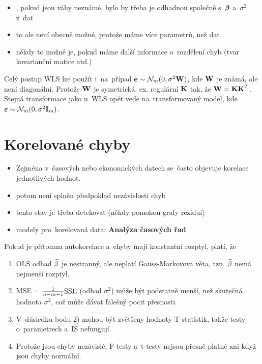 \begin{remark}
\begin{itemize}
	\item, pokud jsou váhy neznámé, bylo by třeba je odhadnou společně s~$\boldsymbol{\beta}$ a~$\sigma^2$ z~dat
	\item to ale není obecně možné, protože máme více parametrů, než dat
	\item někdy to možné je, pokud máme další informace o~rozdělení chyb (tvar kovarianční matice atd.)
\end{itemize}
\end{remark}

\begin{remark}
	Celý postup WLS lze použít i~na~případ $\mathbf{e} \sim \mathcal{N}_m(0,\sigma^2 \textbf{W})$, kde $\textbf{W}$ je známá, ale není diagonální. Protože $\textbf{W}$ je symetrická, ex. regulární $\textbf{K}$ tak, že $\textbf{W} = \textbf{K} \textbf{K}^T$. Stejná transformace jako u~WLS opět vede na~transformovaný model, kde $\boldsymbol{\varepsilon} \sim \mathcal{N}_m(0,\sigma^2 \textbf{I}_{m})$.
\end{remark}

\section{Korelované chyby}
\begin{itemize}
\item Zejména v~časových nebo ekonomických datech se~často objevuje korelace jednotlivých hodnot.
\item potom není splněn předpoklad nezávislosti chyb
\item tento stav je třeba detekovat (někdy pomohou grafy reziduí)
\item modely pro~korelovaná data: \textbf{Analýza časových řad}
\end{itemize}

Pokud je přítomna autokorelace a~chyby mají konstantní rozptyl, platí, že
\begin{enumerate}
\item OLS odhad $\widehat{\beta}$ je nestranný, ale neplatí Gauss-Markovova věta, tzn. $\widehat{\beta}$ nemá nejmenší rozptyl.
\item MSE = $\frac{1}{n-m-1}\mathrm{SSE}$ (odhad $\sigma^2$) může být podstatně menší, než skutečná hodnota $\sigma^2$, což může dávat falešný pocit přesnosti.
\item V~důsledku bodu 2) mohou být zvětšeny hodnoty T statistik, takže testy o~parametrech a~IS nefungují.
\item Protože jsou chyby nezávislé, F-testy a~t-testy nejsou přesně platné ani když jsou chyby normální.
\end{enumerate}

